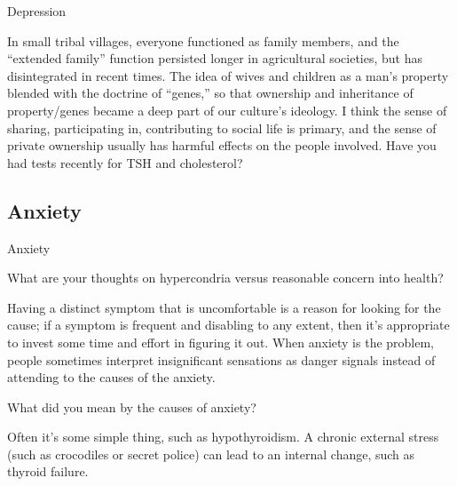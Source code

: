 \documentclass[11pt,oneside,openany,extrafontsizes]{memoir}
\begin{document}
\begin{standalonequote}{Depression}

    \begin{answer}
      In small tribal villages, everyone functioned as family members, and the \enquote{extended family} function persisted longer in agricultural societies, but has disintegrated in recent times. The idea of wives and children as a man's property blended with the doctrine of \enquote{genes,} so that ownership and inheritance of property/genes became a deep part of our culture's ideology. I think the sense of sharing, participating in, contributing to social life is primary, and the sense of private ownership usually has harmful effects on the people involved. Have you had tests recently for TSH and cholesterol?
    \end{answer}
\end{standalonequote}

\subsection{Anxiety}

\begin{emailexchange}{Anxiety}

    \begin{question}
        What are your thoughts on hypercondria versus reasonable concern into health?
    \end{question}

    \begin{answer}
       Having a distinct symptom that is uncomfortable is a reason for looking for the cause; if a symptom is frequent and disabling to any extent, then it's appropriate to invest some time and effort in figuring it out. When anxiety is the problem, people sometimes interpret insignificant sensations as danger signals instead of attending to the causes of the anxiety. 
    \end{answer}

    \begin{question}
        What did you mean by the causes of anxiety?
    \end{question}

    \begin{answer}
       Often it's some simple thing, such as hypothyroidism. A chronic external stress (such as crocodiles or secret police) can lead to an internal change, such as thyroid failure. 
    \end{answer}
\end{emailexchange}
\end{document}
